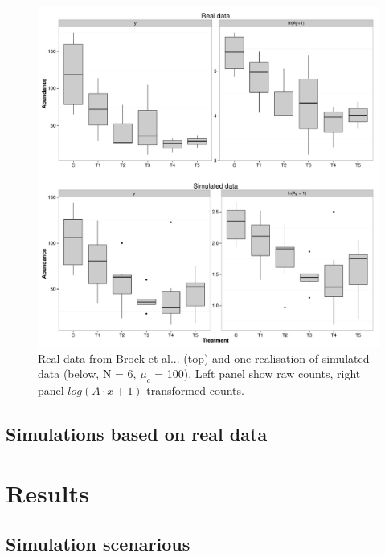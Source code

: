 \documentclass{scrartcl}\usepackage[]{graphicx}\usepackage[]{color}
\begin{document}
\begin{figure}
  \includegraphics[width = \textwidth]{p4_1.pdf}
  \caption{Real data from Brock et al... (top) and one realisation of simulated data (below, N = 6, $\mu_c$ = 100). Left panel show raw counts, right panel $log(A \cdot x + 1)$ transformed counts.}
\end{figure}

\subsection{Simulations based on real data}

\section{Results}
\subsection{Simulation scenarious}
\end{document}
